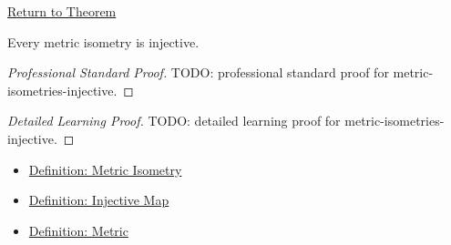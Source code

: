 \newpage
{}
\label{prf:metric-isometries-injective}

\begin{remark*}[Return]
\hyperref[thm:metric-isometries-injective]{Return to Theorem}
\end{remark*}

\begin{theorem*}
Every metric isometry is injective.
\end{theorem*}

\begin{proof}[Professional Standard Proof]
\LRAProofBodyStart
TODO: professional standard proof for metric-isometries-injective.
\end{proof}

\begin{proof}[Detailed Learning Proof]
\LRAProofBodyStart
TODO: detailed learning proof for metric-isometries-injective.
\end{proof}

\begin{remark*}
\end{remark*}

\begin{dependencies}
\begin{itemize}
  \item \hyperref[def:metric-isometry]{Definition: Metric Isometry}
  \item \hyperref[def:injective-map]{Definition: Injective Map}
  \item \hyperref[def:metric-on-set]{Definition: Metric}
\end{itemize}
\end{dependencies}

\clearpage
